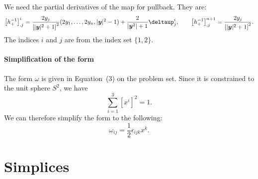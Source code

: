 \documentclass[11pt, english, fleqn, DIV=15, headinclude, BCOR=1cm]{scrartcl}
\begin{document}
We need the partial derivatives of the map for pullback. They are:
\[
    \sbr{h_+\inv}^i_{,j} = \frac{2 y_j}{\sbr{|\vec y|^2 + 1}^2}
    (2 y_1, \ldots, 2y_n, |\vec y|^2 - 1)
    + \frac{2}{|\vec y^2| + 1} \deltaup^i_j
    \eqnsep
    \sbr{h_+\inv}^{n+1}_{,j} = \frac{2 y_j}{\sbr{|\vec y|^2 + 1}^2}.
\]
The indices $i$ and $j$ are from the index set $\{1, 2\}$.

\paragraph{Simplification of the form}

The form $\omega$ is given in Equation~(3) on the problem set. Since it is
constrained to the unit sphere $S^2$, we have
\[
    \sum_{i = 1}^3 [x^i]^2 = 1.
\]
We can therefore simplify the form to the following:
\[
    \omega_{ij} = \frac12 \epsilon_{ijk} x^k.
\]

\section{Simplices}
\label{homework:3}
\end{document}
